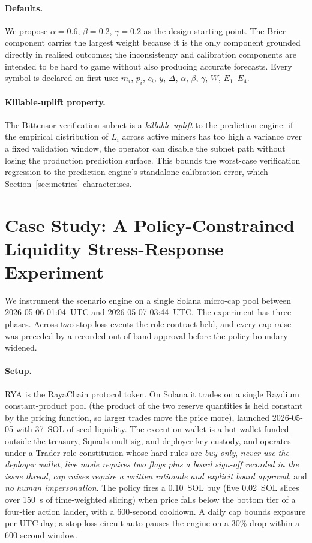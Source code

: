 \documentclass[11pt,a4paper]{article}
\begin{document}
\paragraph{Defaults.} We propose $\alpha = 0.6$, $\beta = 0.2$,
$\gamma = 0.2$ as the design starting point. The Brier component carries
the largest weight because it is the only component grounded directly in
realised outcomes; the inconsistency and calibration components are
intended to be hard to game without also producing accurate forecasts.
Every symbol is declared on first use: $m_i$, $p_i$, $c_i$, $y$,
$\Delta$, $\alpha$, $\beta$, $\gamma$, $W$, $E_1$--$E_4$.

\paragraph{Killable-uplift property.} The Bittensor verification subnet
is a \emph{killable uplift} to the prediction engine: if the empirical
distribution of $L_i$ across active miners has too high a variance over
a fixed validation window, the operator can disable the subnet path
without losing the production prediction surface. This bounds the
worst-case verification regression to the prediction engine's standalone
calibration error, which Section~\ref{sec:metrics} characterises.

\section{Case Study: A Policy-Constrained Liquidity Stress-Response Experiment}\label{sec:case-study}

We instrument the scenario engine on a single Solana micro-cap pool
between 2026-05-06 01:04~UTC and 2026-05-07 03:44~UTC. The experiment
has three phases. Across two stop-loss events the role contract held,
and every cap-raise was preceded by a recorded out-of-band approval
before the policy boundary widened.

\paragraph{Setup.} \textsc{RYA} is the RayaChain protocol token. On
Solana it trades on a single Raydium constant-product pool (the product
of the two reserve quantities is held constant by the pricing function,
so larger trades move the price more), launched 2026-05-05 with
37~SOL of seed liquidity. The execution wallet is a hot wallet funded
outside the treasury, Squads multisig, and deployer-key custody, and
operates under a Trader-role constitution whose hard rules are
\emph{buy-only}, \emph{never use the deployer wallet}, \emph{live mode
requires two flags plus a board sign-off recorded in the issue thread},
\emph{cap raises require a written rationale and explicit board
approval}, and \emph{no human impersonation}. The policy fires a
0.10~SOL buy (five 0.02~SOL slices over 150~s of time-weighted slicing)
when price falls below the bottom tier of a four-tier action ladder,
with a 600-second cooldown. A daily cap bounds exposure per UTC day;
a stop-loss circuit auto-pauses the engine on a 30\% drop within a
600-second window.
\end{document}
